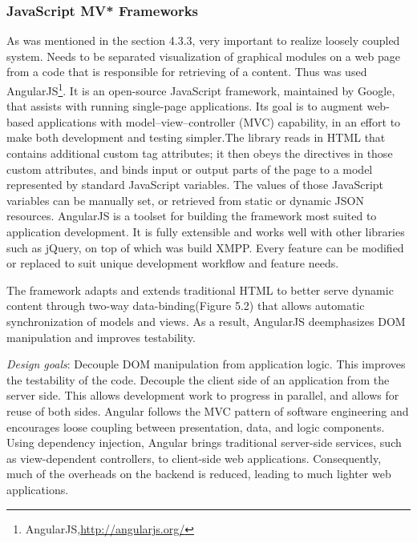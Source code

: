 \subsubsection{JavaScript MV* Frameworks}
	As was mentioned in the section 4.3.3, very important to realize loosely coupled system. Needs to be separated visualization of graphical modules on a web page from a code that is responsible for retrieving of a content. Thus was used AngularJS\footnote{AngularJS,\url{http://angularjs.org/}}. It is an open-source JavaScript framework, maintained by Google, that assists with running single-page applications. Its goal is to augment web-based applications with model–view–controller (MVC) capability, in an effort to make both development and testing simpler.The library reads in HTML that contains additional custom tag attributes; it then obeys the directives in those custom attributes, and binds input or output parts of the page to a model represented by standard JavaScript variables. The values of those JavaScript variables can be manually set, or retrieved from static or dynamic JSON resources\cite{ wiki:angular}. AngularJS is a toolset for building the framework most suited to application development. It is fully extensible and works well with other libraries such as jQuery, on top of which was build XMPP. Every feature can be modified or replaced to suit unique development workflow and feature needs.

    The framework adapts and extends traditional HTML to better serve dynamic content through two-way data-binding(Figure 5.2) that allows automatic synchronization of models and views. As a result, AngularJS deemphasizes DOM manipulation and improves testability.

	\emph{Design goals}:
	\newline
	Decouple DOM manipulation from application logic. This improves the testability of the code. Decouple the client side of an application from the server side. This allows development work to progress in parallel, and allows for reuse of both sides.	Angular follows the MVC pattern of software engineering and encourages loose coupling between presentation, data, and logic components. Using dependency injection, Angular brings traditional server-side services, such as view-dependent controllers, to client-side web applications. Consequently, much of the overheads on the backend is reduced, leading to much lighter web applications.

